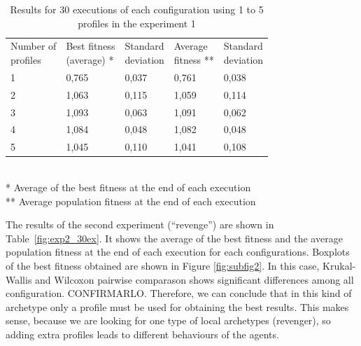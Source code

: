 \documentclass[runningheads]{llncs}
\begin{document}
\begin{table}
\begin{center}
\caption{Results for 30 executions of each configuration using 1 to 5 profiles in the experiment 1}
\label{fig:exp1_30ex}

\begin{tabular}{lllll}
\hline\noalign{\smallskip}
\parbox[t]{2cm}{Number of\\ profiles} 
& \parbox[t]{2cm}{Best fitness\\(average) *} 
& \parbox[t]{2cm}{Standard\\deviation}
& \parbox[t]{2cm}{Average\\fitness **}
& \parbox[t]{2cm}{Standard\\deviation}\\
\noalign{\smallskip}
\hline
\noalign{\smallskip}
1 & 0,765 & 0,037 & 0,761 & 0,038 \\
2 & 1,063 & 0,115 & 1,059 & 0,114 \\
3 & 1,093 & 0,063 & 1,091 & 0,062 \\
4 & 1,084 & 0,048 & 1,082 & 0,048 \\
5 & 1,045 & 0,110 & 1,041 & 0,108 \\
\hline
\end{tabular}
\\
\** Average of the best fitness at the end of each execution\\
\*** Average population fitness  at the end of each execution \\
\end{center}
\end{table}





The results of the second experiment (``revenge'') are shown in Table~\ref{fig:exp2_30ex}. It shows the average of the best fitness and the average population fitness at the end of each execution for each configurations. Boxplots of the best fitness obtained are shown in Figure \ref{fig:subfig2}. In this case, Krukal-Wallis and Wilcoxon pairwise comparason shows significant differences among all configuration. CONFIRMARLO. Therefore, we can conclude that in this kind of archetype only a profile must be used for obtaining the best results. This makes sense, because we are looking for one type of local archetypes (revenger), so adding extra profiles leads to different behaviours of the agents.
\end{document}
